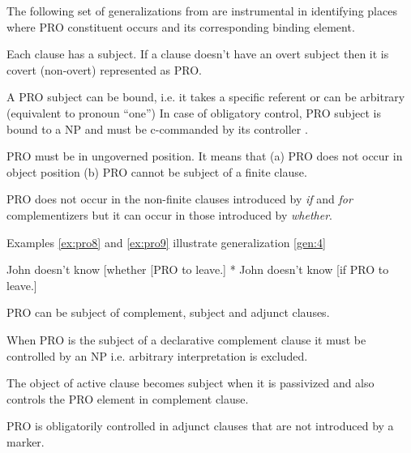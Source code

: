 The following set of generalizations from \cite{Haegeman1991} are instrumental in identifying places where PRO constituent occurs and its corresponding binding element.

\begin{generalization}\label{gen:1}
	Each clause has a subject. If a clause doesn't have an overt subject then it is covert (non-overt) represented as PRO. \cite[p.~263]{Haegeman1991}
\end{generalization}
\begin{generalization}\label{gen:2}
	A PRO subject can be bound, i.e. it takes a specific referent or can be arbitrary (equivalent to pronoun ``one'') \cite[p.~263]{Haegeman1991} In case of obligatory control, PRO subject is bound to a NP and must be c-commanded by its controller \cite[p.~278]{Haegeman1991}.
\end{generalization}

\begin{generalization}\label{gen:3}
	PRO must be in ungoverned position. It means that (a) PRO does not occur in object position (b) PRO cannot be subject of a finite clause.
\end{generalization}
\begin{generalization}\label{gen:4}
	PRO does not occur in the non-finite clauses introduced by \textit{if} and \textit{for} complementizers but it can occur in those introduced by \textit{whether}.  
\end{generalization}
Examples \ref{ex:pro8} and \ref{ex:pro9} illustrate generalization \ref{gen:4}
\begin{exe}
	\ex\label{ex:pro8} John doesn't know [whether [PRO to leave.]
	\ex\label{ex:pro9} * John doesn’t know [if PRO to leave.]
\end{exe}

\begin{generalization}\label{gen:5}
	PRO can be subject of complement, subject and adjunct clauses. \cite[p.~278]{Haegeman1991}
\end{generalization}
\begin{generalization}\label{gen:6}
	When PRO is the subject of a declarative complement clause it must be controlled by an NP i.e. arbitrary interpretation is excluded. \cite[p.~280]{Haegeman1991}
\end{generalization}
\begin{generalization}\label{gen:7}
	The object of active clause becomes subject when it is passivized and also controls the PRO element in complement clause. \cite[p.~281]{Haegeman1991}
\end{generalization}
\begin{generalization}\label{gen:8}
	PRO is obligatorily controlled in adjunct clauses that are not introduced by a marker. \cite[p.~283]{Haegeman1991}
\end{generalization}

